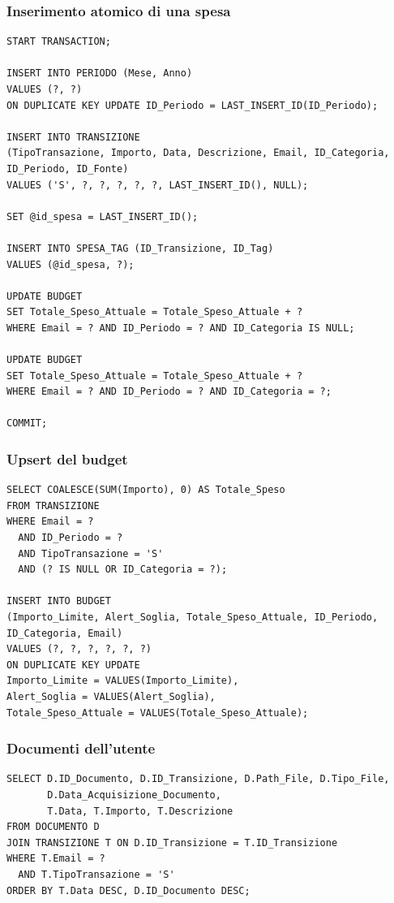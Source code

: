 \documentclass[11pt,a4paper]{article}
\begin{document}
\subsubsection{Inserimento atomico di una spesa}
\begin{lstlisting}[caption={Inserimento di una spesa con periodo, tag e budget}]
START TRANSACTION;

INSERT INTO PERIODO (Mese, Anno)
VALUES (?, ?)
ON DUPLICATE KEY UPDATE ID_Periodo = LAST_INSERT_ID(ID_Periodo);

INSERT INTO TRANSIZIONE
(TipoTransazione, Importo, Data, Descrizione, Email, ID_Categoria, ID_Periodo, ID_Fonte)
VALUES ('S', ?, ?, ?, ?, ?, LAST_INSERT_ID(), NULL);

SET @id_spesa = LAST_INSERT_ID();

INSERT INTO SPESA_TAG (ID_Transizione, ID_Tag)
VALUES (@id_spesa, ?);

UPDATE BUDGET
SET Totale_Speso_Attuale = Totale_Speso_Attuale + ?
WHERE Email = ? AND ID_Periodo = ? AND ID_Categoria IS NULL;

UPDATE BUDGET
SET Totale_Speso_Attuale = Totale_Speso_Attuale + ?
WHERE Email = ? AND ID_Periodo = ? AND ID_Categoria = ?;

COMMIT;
\end{lstlisting}

\subsubsection{Upsert del budget}
\begin{lstlisting}[caption={Upsert del budget con totale iniziale coerente}]
SELECT COALESCE(SUM(Importo), 0) AS Totale_Speso
FROM TRANSIZIONE
WHERE Email = ?
  AND ID_Periodo = ?
  AND TipoTransazione = 'S'
  AND (? IS NULL OR ID_Categoria = ?);

INSERT INTO BUDGET
(Importo_Limite, Alert_Soglia, Totale_Speso_Attuale, ID_Periodo, ID_Categoria, Email)
VALUES (?, ?, ?, ?, ?, ?)
ON DUPLICATE KEY UPDATE
Importo_Limite = VALUES(Importo_Limite),
Alert_Soglia = VALUES(Alert_Soglia),
Totale_Speso_Attuale = VALUES(Totale_Speso_Attuale);
\end{lstlisting}

\subsubsection{Documenti dell'utente}
\begin{lstlisting}[caption={Documenti associati alle spese dell'utente}]
SELECT D.ID_Documento, D.ID_Transizione, D.Path_File, D.Tipo_File,
       D.Data_Acquisizione_Documento,
       T.Data, T.Importo, T.Descrizione
FROM DOCUMENTO D
JOIN TRANSIZIONE T ON D.ID_Transizione = T.ID_Transizione
WHERE T.Email = ?
  AND T.TipoTransazione = 'S'
ORDER BY T.Data DESC, D.ID_Documento DESC;
\end{lstlisting}
\end{document}
